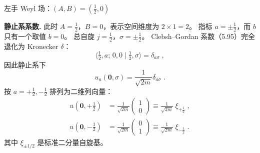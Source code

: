 \begin{center}
    \vspace{2ex}
     \large 左手 Weyl 场：$(A,B)=(\tfrac12,0)$
    \vspace{2ex}
\end{center}
\textbf{静止系系数.}
此时 $A=\tfrac12$，$B=0$，表示空间维度为 $2\times 1=2$。
指标 $a=\pm \tfrac12$，而 $b$ 只有一个取值 $b=0$。
总自旋 $j=\tfrac12$，$\sigma=\pm\tfrac12$。
Clebsh–Gordan 系数（5.95）完全退化为 Kronecker $\delta$：
\[
  \langle \tfrac12,a;\,0,0\mid\tfrac12,\sigma\rangle = \delta_{a\sigma}\;,
\]
因此静止系下
\begin{equation}\label{eq:weylL-u0}
  u_{a}(\mathbf{0},\sigma)
  = \frac{1}{\sqrt{2m}}\delta_{a\sigma}\;.
\end{equation}
按 $a=+\tfrac12,-\tfrac12$ 排列为二维列向量：
\begin{align}
  u(\mathbf{0},+\tfrac12)
  &= \frac{1}{\sqrt{2m}}
  \begin{pmatrix}1\\0\end{pmatrix}
  \equiv \frac{1}{\sqrt{2m}}\;\xi_{+\frac12}\;,
  \label{eq:weylL-u0+}\\[2pt]
  u(\mathbf{0},-\tfrac12)
  &= \frac{1}{\sqrt{2m}}
  \begin{pmatrix}0\\1\end{pmatrix}
  \equiv \frac{1}{\sqrt{2m}}\;\xi_{-\frac12}\;.
  \label{eq:weylL-u0-}
\end{align}
其中 $\xi_{\pm 1/2}$ 是标准二分量自旋基。

